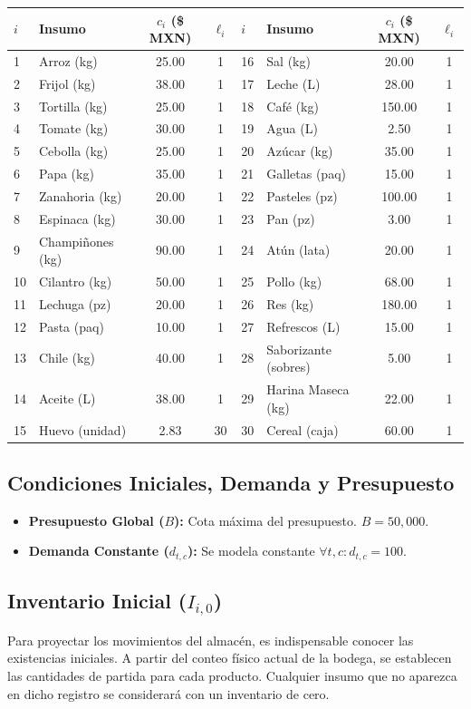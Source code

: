 \documentclass[12pt]{report}
\begin{document}
\begin{longtable}{llcc|llcc}
\toprule
$i$ & \textbf{Insumo} & $c_i$ (\$ MXN) & $\ell_i$ & $i$ & \textbf{Insumo} & $c_i$ (\$ MXN) & $\ell_i$ \\
\midrule
1  & Arroz (kg) & 25.00 & 1 & 16 & Sal (kg) & 20.00 & 1 \\
2  & Frijol (kg) & 38.00 & 1 & 17 & Leche (L) & 28.00 & 1 \\
3  & Tortilla (kg) & 25.00 & 1 & 18 & Café (kg) & 150.00 & 1 \\
4  & Tomate (kg) & 30.00 & 1 & 19 & Agua (L) & 2.50 & 1 \\
5  & Cebolla (kg) & 25.00 & 1 & 20 & Azúcar (kg) & 35.00 & 1 \\
6  & Papa (kg) & 35.00 & 1 & 21 & Galletas (paq) & 15.00 & 1 \\
7  & Zanahoria (kg)& 20.00 & 1 & 22 & Pasteles (pz) & 100.00 & 1 \\
8  & Espinaca (kg) & 30.00 & 1 & 23 & Pan (pz) & 3.00 & 1 \\
9  & Champiñones (kg)& 90.00 & 1 & 24 & Atún (lata) & 20.00 & 1 \\
10 & Cilantro (kg) & 50.00 & 1 & 25 & Pollo (kg) & 68.00 & 1 \\
11 & Lechuga (pz) & 20.00 & 1 & 26 & Res (kg) & 180.00 & 1 \\
12 & Pasta (paq) & 10.00 & 1 & 27 & Refrescos (L) & 15.00 & 1 \\
13 & Chile (kg) & 40.00 & 1 & 28 & Saborizante (sobres)& 5.00 & 1 \\
14 & Aceite (L) & 38.00 & 1 & 29 & Harina Maseca (kg) & 22.00 & 1 \\
15 & Huevo (unidad)& 2.83 & 30 & 30 & Cereal (caja) & 60.00 & 1 \\
\bottomrule
\end{longtable}

\subsection{Condiciones Iniciales, Demanda y Presupuesto}
\begin{itemize}
    \item \textbf{Presupuesto Global ($B$):} Cota máxima del presupuesto. $B = 50,000$.
    \item \textbf{Demanda Constante ($d_{t,c}$):} Se modela constante $\forall t, c: d_{t,c} = 100$.
\end{itemize}

\subsection{Inventario Inicial ($I_{i,0}$)}
Para proyectar los movimientos del almacén, es indispensable conocer las existencias iniciales. A partir del conteo físico actual de la bodega, se establecen las cantidades de partida para cada producto. Cualquier insumo que no aparezca en dicho registro se considerará con un inventario de cero.
\end{document}

